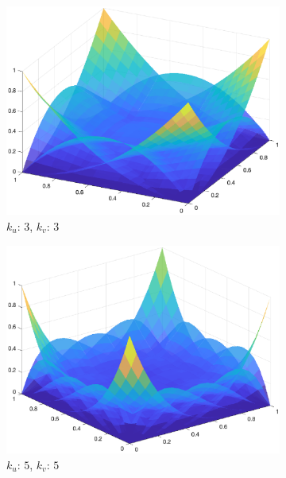 \documentclass[a4paper, 10pt]{article}
\begin{document}
\begin{figure}[]
  \centering
  \begin{subfigure}[b]{0.3\textwidth}
    \includegraphics[width=\textwidth]{figure/bezier_surface_basis33_1.eps}
    \caption{$k_u$: $3$, $k_v$: $3$}
    \label{fig:bezier_surface_basis33_1}
  \end{subfigure}
  \begin{subfigure}[b]{0.3\textwidth}
      \includegraphics[width=\textwidth]{figure/bezier_surface_basis55_1.eps}
      \caption{$k_u$: $5$, $k_v$: $5$}
      \label{fig:bezier_surface_basis55_1}
  \end{subfigure}
  \begin{subfigure}[b]{0.3\textwidth}

\end{subfigure}
\end{figure}
\end{document}
